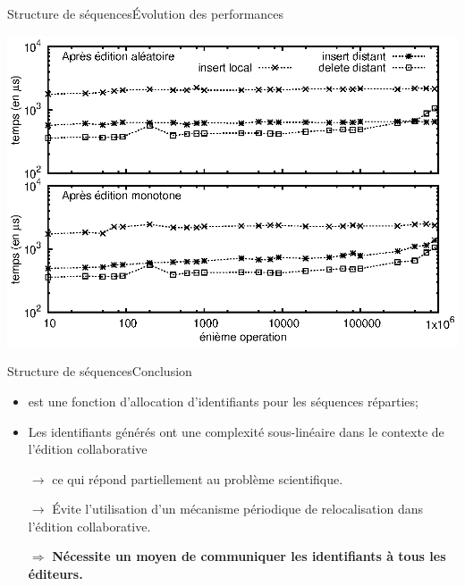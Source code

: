 \begin{frame}{Structure de séquences}{Évolution des performances}

  \begin{center}
    \includegraphics[width=\textwidth]{img/replication/time.eps}
  \end{center}

\end{frame}


\begin{frame}{Structure de séquences}{Conclusion}

  \begin{itemize}
  \item \LSEQ est une fonction d'allocation d'identifiants pour les séquences
    réparties;
  \item Les identifiants générés ont une complexité sous-linéaire dans le contexte
    de l'édition collaborative
  \item [$\rightarrow$] ce qui répond partiellement au problème scientifique.
  \item [$\rightarrow$] Évite l'utilisation d'un mécanisme périodique de
    relocalisation dans l'édition collaborative.
  \end{itemize}


  \vspace{1cm}
  
  \large
  \begin{itemize}
  \item [$\Rightarrow$] \textbf{Nécessite un moyen de communiquer les
      identifiants à tous les éditeurs.}
  \end{itemize}

\end{frame}




